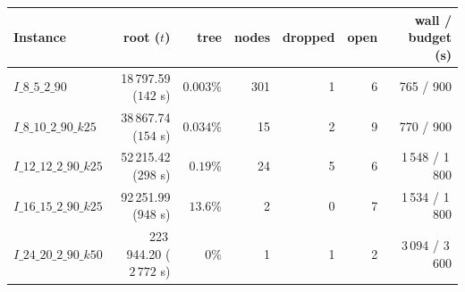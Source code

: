 \begin{table}[!htbp]
\vspace{6pt}

\begin{tabular}{lrrrrrr}
\toprule
Instance & root ($t$) & tree & nodes & dropped & open & wall / budget (s) \\
\midrule
$I\_8\_5\_2\_90$        & 18\,797.59 ($142$ s) & $0.003\%$ & 301 & 1 & 6 & 765 / 900 \\
$I\_8\_10\_2\_90\_k25$  & 38\,867.74 ($154$ s) & $0.034\%$ & 15 & 2 & 9 & 770 / 900 \\
$I\_12\_12\_2\_90\_k25$ & 52\,215.42 ($298$ s) & $0.19\%$ & 24 & 5 & 6 & 1\,548 / 1\,800 \\
$I\_16\_15\_2\_90\_k25$ & 92\,251.99 ($948$ s) & $\mathbf{13.6\%}$ & 2 & 0 & 7 & 1\,534 / 1\,800 \\
$I\_24\_20\_2\_90\_k50$ & 223\,944.20 ($2\,772$ s) & $0\%$ & 1 & 1 & 2 & 3\,094 / 3\,600 \\
\bottomrule
\end{tabular}
\end{table}
